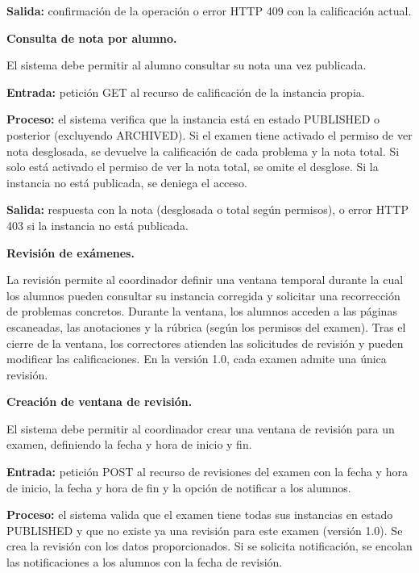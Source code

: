 \begin{functional}
\begin{functional}
    \textbf{Salida:} confirmación de la operación o error HTTP 409 con la calificación actual.

    \item \textbf{Consulta de nota por alumno.}

    El sistema debe permitir al alumno consultar su nota una vez publicada.

    \textbf{Entrada:} petición GET al recurso de calificación de la instancia propia.

    \textbf{Proceso:} el sistema verifica que la instancia está en estado PUBLISHED o posterior (excluyendo ARCHIVED). Si el examen tiene activado el permiso de ver nota desglosada, se devuelve la calificación de cada problema y la nota total. Si solo está activado el permiso de ver la nota total, se omite el desglose. Si la instancia no está publicada, se deniega el acceso.

    \textbf{Salida:} respuesta con la nota (desglosada o total según permisos), o error HTTP 403 si la instancia no está publicada.

  \end{functional}

  \item \textbf{Revisión de exámenes.}

  La revisión permite al coordinador definir una ventana temporal durante la cual los alumnos pueden consultar su instancia corregida y solicitar una recorrección de problemas concretos. Durante la ventana, los alumnos acceden a las páginas escaneadas, las anotaciones y la rúbrica (según los permisos del examen). Tras el cierre de la ventana, los correctores atienden las solicitudes de revisión y pueden modificar las calificaciones. En la versión 1.0, cada examen admite una única revisión.

  \begin{functional}
    \item \textbf{Creación de ventana de revisión.}

    El sistema debe permitir al coordinador crear una ventana de revisión para un examen, definiendo la fecha y hora de inicio y fin.

    \textbf{Entrada:} petición POST al recurso de revisiones del examen con la fecha y hora de inicio, la fecha y hora de fin y la opción de notificar a los alumnos.

    \textbf{Proceso:} el sistema valida que el examen tiene todas sus instancias en estado PUBLISHED y que no existe ya una revisión para este examen (versión 1.0). Se crea la revisión con los datos proporcionados. Si se solicita notificación, se encolan las notificaciones a los alumnos con la fecha de revisión.


\end{functional}
\end{functional}
